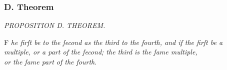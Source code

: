 \documentclass[11pt,preview]{standalone}
\begin{document}
\subsubsection{D. Theorem}

\newcommand{\yellowcircles}{\hspace{-1ex}\begin{array}{c} \yellowcircle \\ \yellowcircle\hspace{-0.75ex}\yellowcircle \end{array}\hspace{-1ex}}
\newcommand{\reddomes}{\hspace{-1ex}\begin{array}{c} \rotatebox[origin=c]{180}{$\reddome$} \\ \reddome\hspace{-0.75ex}\reddome \end{array}\hspace{-1ex}}
\newcommand{\reddiamonds}{\hspace{-1ex}\begin{array}{c} \reddiamond\hspace{-0.75ex}\reddiamond \\ \reddiamond\hspace{-0.75ex}\reddiamond \end{array}\hspace{-1ex}}
\newcommand{\blackdrops}{\hspace{-1ex}\begin{array}{c} \blackdrop\hspace{-0.75ex}\blackdrop \\ \blackdrop\hspace{-0.75ex}\blackdrop \end{array}\hspace{-1ex}}

\begin{minipage}{\textwidth}
    \begin{center}
        \textit{PROPOSITION D. THEOREM.}\label{book5prD} \\
    \end{center}

    \hfill

    \begin{center}
        \raggedright \lettrine[lines=3, loversize=1, nindent=0pt]{}{}F \textit{he firſt be to the ſecond as the third to the fourth, and if the firſt be a\\ multiple, or a part of the ſecond; the third is the ſame multiple,\\ or the ſame part of the fourth}.
    \end{center}
\end{minipage}
\end{document}

